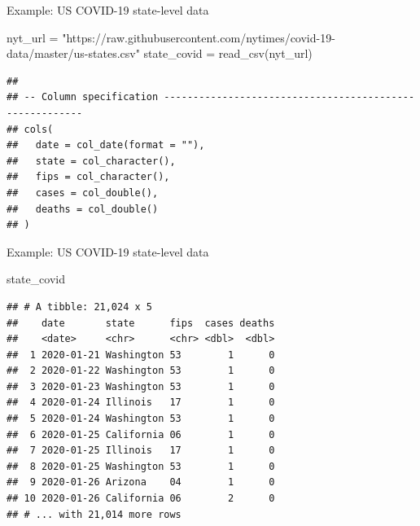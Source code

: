 \documentclass[
  ignorenonframetext,
]{beamer}
\newenvironment{Shaded}{\begin{snugshade}}{\end{snugshade}}
\newcommand{\FunctionTok}[1]{\textcolor[rgb]{0.00,0.00,0.00}{#1}}
\newcommand{\NormalTok}[1]{#1}
\newcommand{\OtherTok}[1]{\textcolor[rgb]{0.56,0.35,0.01}{#1}}
\newcommand{\StringTok}[1]{\textcolor[rgb]{0.31,0.60,0.02}{#1}}
\begin{document}
\begin{frame}[fragile]{Example: US COVID-19 state-level data}
\protect\hypertarget{example-us-covid-19-state-level-data}{}
\begin{Shaded}
\begin{Highlighting}[]
\NormalTok{nyt\_url }\OtherTok{=} \StringTok{"https://raw.githubusercontent.com/nytimes/covid{-}19{-}data/master/us{-}states.csv"}
\NormalTok{state\_covid }\OtherTok{=} \FunctionTok{read\_csv}\NormalTok{(nyt\_url)}
\end{Highlighting}
\end{Shaded}

\begin{verbatim}
## 
## -- Column specification --------------------------------------------------------
## cols(
##   date = col_date(format = ""),
##   state = col_character(),
##   fips = col_character(),
##   cases = col_double(),
##   deaths = col_double()
## )
\end{verbatim}
\end{frame}

\begin{frame}[fragile]{Example: US COVID-19 state-level data}
\protect\hypertarget{example-us-covid-19-state-level-data-1}{}
\begin{Shaded}
\begin{Highlighting}[]
\NormalTok{state\_covid}
\end{Highlighting}
\end{Shaded}

\begin{verbatim}
## # A tibble: 21,024 x 5
##    date       state      fips  cases deaths
##    <date>     <chr>      <chr> <dbl>  <dbl>
##  1 2020-01-21 Washington 53        1      0
##  2 2020-01-22 Washington 53        1      0
##  3 2020-01-23 Washington 53        1      0
##  4 2020-01-24 Illinois   17        1      0
##  5 2020-01-24 Washington 53        1      0
##  6 2020-01-25 California 06        1      0
##  7 2020-01-25 Illinois   17        1      0
##  8 2020-01-25 Washington 53        1      0
##  9 2020-01-26 Arizona    04        1      0
## 10 2020-01-26 California 06        2      0
## # ... with 21,014 more rows
\end{verbatim}
\end{frame}
\end{document}
